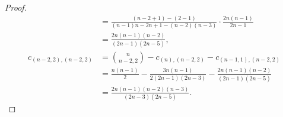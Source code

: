 \documentclass[10pt,oneside,american]{amsart}
\numberwithin{equation}{section}
\numberwithin{figure}{section}
\theoremstyle{definition}
\theoremstyle{remark}
\theoremstyle{plain}
\theoremstyle{definition}
\theoremstyle{plain}
\begin{document}
\begin{proof}
\begin{align*}
  &= \frac{\left(n-2+1\right)-\left(2-1\right)}{\left(n-1\right)n-2n+1-\left(n-2\right)\left(n-3\right)}\cdot\frac{2n\left(n-1\right)}{2n-1}\\
  &= \frac{2n\left(n-1\right)\left(n-2\right)}{\left(2n-1\right)\left(2n-5\right)},\\
  c_{\left(n-2,2\right),\left(n-2,2\right)}
  &= \binom{n}{n-2,2}-c_{\left(n\right),\left(n-2,2\right)}-c_{\left(n-1,1\right),\left(n-2,2\right)}\\
  &= \frac{n\left(n-1\right)}{2}-\frac{3n\left(n-1\right)}{2\left(2n-1\right)\left(2n-3\right)}-\frac{2n\left(n-1\right)\left(n-2\right)}{\left(2n-1\right)\left(2n-5\right)}\\
  &= \frac{2n\left(n-1\right)\left(n-2\right)\left(n-3\right)}{\left(2n-3\right)\left(2n-5\right)}.
\end{align*}
\end{proof}

\end{document}

